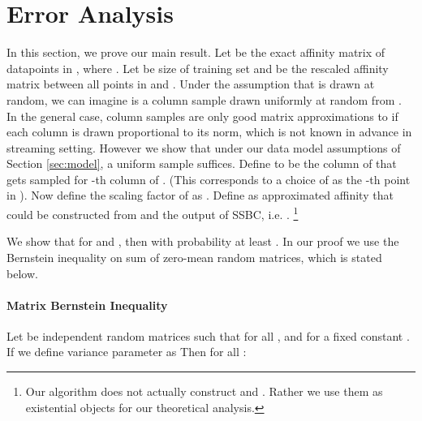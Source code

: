 \documentclass{sig-alternate}
\begin{document}
\section{Error Analysis}\label{sec:err}
In this section, we prove our main result. 
Let  be the exact affinity matrix of  datapoints in , where . 
Let  be size of training set and  be the rescaled affinity matrix between all points in  and . 
Under the assumption that  is drawn at random, we can imagine  is a column sample drawn uniformly at random from .
In the general case, column samples are only good matrix approximations to  if each column is drawn proportional to its norm, which is not known in advance in streaming setting. However we show that under our data model assumptions of Section \ref{sec:model}, a uniform sample suffices.
Define  to be the column of  that gets sampled for -th column of . (This corresponds to a choice of  as the -th point in ). Now define the scaling factor of  as . 
Define  as approximated affinity that could be constructed from  and the output of SSBC, i.e. . 
\footnote{Our algorithm does not actually construct  and . Rather we use them as existential objects for our theoretical analysis.}

 We show that for  and , then  with probability at least .
In our proof we use the Bernstein inequality on sum of zero-mean random matrices, which is stated below.

\paragraph{Matrix Bernstein Inequality}
Let  be independent random matrices such that for all ,  and  for a fixed constant . If we define variance parameter as 
Then for all :
\end{document}
